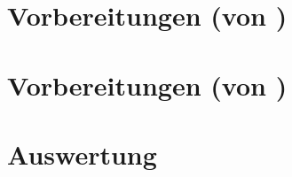 \documentclass{include/protokollclass}
\begin{document}
	\FrontMatter
	
	
	\begingroup \let\clearpage\relax %
	\tableofcontents
	\listoffigures
	\listoftables
	\endgroup
	
	
	
	\MainMatter
	
	\chapter{Vorbereitungen (von \namea)}
	\chapter{Vorbereitungen (von \nameb)}
	\chapter{Auswertung}
	
	\Appendix
	\chapter*{\appendixname}  %
	
	
	
	\TheBibliography
	
	
	
	
\end{document}
